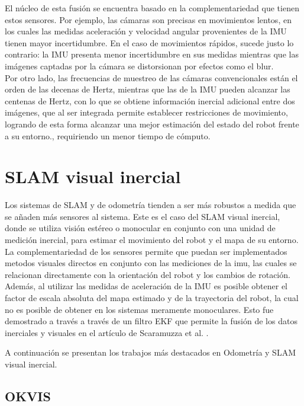 El núcleo de esta fusión se encuentra basado en la complementariedad que tienen estos sensores. Por ejemplo, las cámaras son precisas en movimientos lentos, en los cuales las medidas aceleración y velocidad angular provenientes de la IMU tienen mayor incertidumbre. En el caso de movimientos rápidos, sucede justo lo contrario: la IMU presenta menor incertidumbre en sus medidas mientras que las imágenes captadas por la cámara se distorsionan por efectos como el blur. \\

Por otro lado,  las frecuencias de muestreo de las cámaras convencionales están el orden de las decenas de Hertz, mientras que las de la IMU pueden alcanzar las centenas de Hertz, con lo que se  obtiene información inercial adicional entre dos imágenes, que al ser integrada permite establecer restricciones de movimiento,  logrando de esta forma alcanzar una mejor estimación del estado del robot frente a su entorno., requiriendo un menor tiempo de cómputo. \\



\section{SLAM visual inercial}

Los sistemas de SLAM y de odometría tienden a ser más robustos a medida que se añaden más sensores al sistema. Este es el caso del SLAM visual inercial, donde se utiliza visión estéreo o monocular en conjunto con una unidad de medición inercial, para estimar el movimiento del robot y el mapa de su entorno.  La complementariedad de los sensores permite que puedan ser implementados metodos visuales directos en conjunto con las mediciones de la imu, las cuales se relacionan directamente con la orientación del robot y los cambios de rotación. Además, al utilizar las medidas de aceleración de la IMU es posible obtener el factor de escala absoluta  del mapa estimado y de la trayectoria del robot, la cual no es posible de obtener en los sistemas meramente monoculares. Esto fue demostrado a través a través de un filtro EKF que permite la fusión de los datos inerciales y visuales en el artículo de  Scaramuzza et al. \cite{scaramuzza}.

A continuación se presentan los trabajos más destacados en Odometría y SLAM visual inercial.

\subsection{OKVIS}


